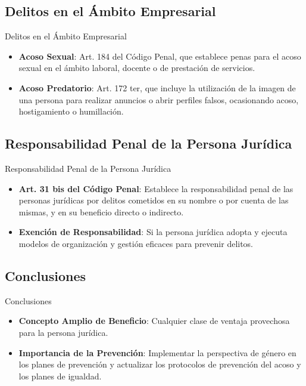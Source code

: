 \documentclass{beamer}
\begin{document}
    \subsection{Delitos en el Ámbito Empresarial}
    \begin{frame}{Delitos en el Ámbito Empresarial}
        \begin{itemize}
            \item \textbf{Acoso Sexual}: Art. 184 del Código Penal, que establece penas para el acoso sexual en el ámbito laboral, docente o de prestación de servicios.
            \item \textbf{Acoso Predatorio}: Art. 172 ter, que incluye la utilización de la imagen de una persona para realizar anuncios o abrir perfiles falsos, ocasionando acoso, hostigamiento o humillación.
        \end{itemize}
    \end{frame}

    \subsection{Responsabilidad Penal de la Persona Jurídica}
    \begin{frame}{Responsabilidad Penal de la Persona Jurídica}
        \begin{itemize}
            \item \textbf{Art. 31 bis del Código Penal}: Establece la responsabilidad penal de las personas jurídicas por delitos cometidos en su nombre o por cuenta de las mismas, y en su beneficio directo o indirecto.
            \item \textbf{Exención de Responsabilidad}: Si la persona jurídica adopta y ejecuta modelos de organización y gestión eficaces para prevenir delitos.
        \end{itemize}
    \end{frame}

    \subsection{Conclusiones}
    \begin{frame}{Conclusiones}
        \begin{itemize}
            \item \textbf{Concepto Amplio de Beneficio}: Cualquier clase de ventaja provechosa para la persona jurídica.
            \item \textbf{Importancia de la Prevención}: Implementar la perspectiva de género en los planes de prevención y actualizar los protocolos de prevención del acoso y los planes de igualdad.
        \end{itemize}
    \end{frame}
\end{document}
